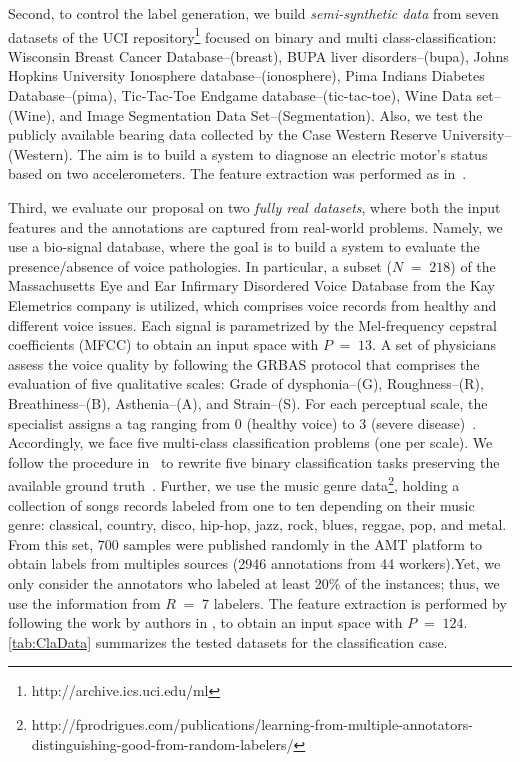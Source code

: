 \documentclass[journal]{IEEEtran}
\DeclareMathOperator{\igual}{\!\,=\!\,}
\begin{document}
Second, to control the label generation, we build \textit{semi-synthetic data} from seven datasets of the {UCI repository}\footnote{http://archive.ics.uci.edu/ml} focused on binary and multi class-classification: {Wisconsin Breast Cancer Database}--(breast), {BUPA liver disorders}--(bupa), {Johns Hopkins University Ionosphere database}--(ionosphere), {Pima Indians Diabetes Database}--(pima), {Tic-Tac-Toe Endgame database}--(tic-tac-toe), {Wine Data set}--(Wine), and {Image Segmentation Data Set}--(Segmentation). Also, we test the publicly available bearing data collected by the Case Western Reserve University--(Western). The aim is to build a system to diagnose an electric motor's status based on two accelerometers. The feature extraction was performed as in~\cite{hernandez2020bearing}.

Third, we evaluate our proposal on two \textit{fully real datasets}, where both the input features and the annotations are captured from real-world problems. Namely, we use a bio-signal database, where the goal is to build a system to evaluate the presence/absence of voice pathologies. In particular, a subset ($N\igual218$) of the Massachusetts Eye and Ear Infirmary Disordered Voice Database from the Kay Elemetrics company is utilized, which comprises voice records from healthy and different voice issues.  Each signal is parametrized by the Mel-frequency cepstral coefficients (MFCC) to obtain an input space with $P\igual13$. A set of physicians assess the voice quality by following the GRBAS protocol that comprises the evaluation of five qualitative scales: Grade of dysphonia--(G), Roughness--(R), Breathiness--(B), Asthenia--(A), and Strain--(S). For each perceptual scale, the specialist assigns a tag ranging from 0 (healthy voice) to 3 (severe disease)~\cite{arias2011automatic}. Accordingly, we face five multi-class classification problems (one per scale).  We follow the procedure in~\cite{gil2018learning} to rewrite five binary classification tasks preserving the available ground truth~\cite{gonzalez2015automatic}. Further, we use the music genre data\footnote{http://fprodrigues.com/publications/learning-from-multiple-annotators-distinguishing-good-from-random-labelers/}, holding a collection of songs records labeled from one to ten depending on their music genre: classical, country, disco, hip-hop, jazz, rock, blues, reggae, pop, and metal. From this set, $700$ samples were published randomly in the AMT platform to obtain labels from multiples sources (2946 annotations from 44 workers).Yet, we only consider the annotators who labeled at least 20\% of the instances; thus, we use the information from $R \igual 7$ labelers. The feature extraction is performed by following the work by authors in \cite{rodrigues2013learning}, to obtain an input space with $P\igual124$. \cref{tab:ClaData} summarizes the tested datasets for the classification case.
\end{document}
